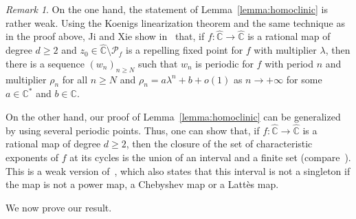 \documentclass[11pt]{article}
\theoremstyle{plain}
\theoremstyle{definition}
\theoremstyle{remark}
\newtheorem{remark}[theorem]{Remark}
\begin{document}
\begin{remark}
On the one hand, the statement of Lemma~\ref{lemma:homoclinic} is rather weak. Using the Koenigs linearization theorem and the same technique as in the proof above, Ji and Xie show in~\cite[\S2]{JX2022} that, if $f \colon \widehat{\mathbb{C}} \to \widehat{\mathbb{C}}$ is a rational map of degree $d \geq 2$ and $z_{0} \in \widehat{\mathbb{C}} \setminus \mathcal{P}_{f}$ is a repelling fixed point for $f$ with multiplier $\lambda$, then there is a sequence $(w_{n})_{n \geq N}$ such that $w_{n}$ is periodic for $f$ with period $n$ and multiplier $\rho_{n}$ for all $n \geq N$ and $\rho_{n} = a \lambda^{n} +b +o(1)$ as $n \to +\infty$ for some $a \in \mathbb{C}^{*}$ and $b \in \mathbb{C}$.

On the other hand, our proof of Lemma~\ref{lemma:homoclinic} can be generalized by using several periodic points. Thus, one can show that, if $f \colon \widehat{\mathbb{C}} \to \widehat{\mathbb{C}}$ is a rational map of degree $d \geq 2$, then the closure of the set of characteristic exponents of $f$ at its cycles is the union of an interval and a finite set (compare~\cite[Proof of Lem.\,2.1]{FG2022}). This is a weak version of~\cite[Cor.\,1.16]{JX2022}, which also states that this interval is not a singleton if the map is not a power map, a Chebyshev map or a Lattès map.
\end{remark}

We now prove our result.
\end{document}
